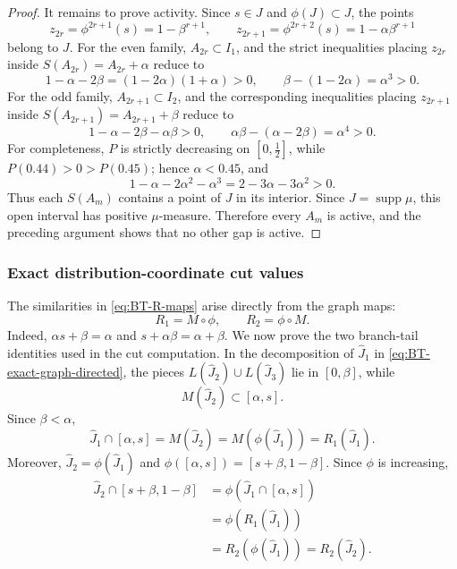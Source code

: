\documentclass[11pt]{amsart}
\theoremstyle{plain}
\theoremstyle{definition}
\theoremstyle{remark}
\DeclareMathOperator{\supp}{supp}
\begin{document}
\begin{proof}
It remains to prove activity. Since \(s\in J\) and \(\phi(J)\subset J\), the points
\[
        z_{2r}=\phi^{2r+1}(s)=1-\beta^{r+1},
        \qquad
        z_{2r+1}=\phi^{2r+2}(s)=1-\alpha\beta^{r+1}
\]
belong to \(J\). For the even family, \(A_{2r}\subset I_1\), and the strict inequalities
placing \(z_{2r}\) inside \(S(A_{2r})=A_{2r}+\alpha\) reduce to
\[
        1-\alpha-2\beta=(1-2\alpha)(1+\alpha)>0,
        \qquad
        \beta-(1-2\alpha)=\alpha^3>0.
\]
For the odd family, \(A_{2r+1}\subset I_2\), and the corresponding inequalities placing
\(z_{2r+1}\) inside \(S(A_{2r+1})=A_{2r+1}+\beta\) reduce to
\[
        1-\alpha-2\beta-\alpha\beta>0,
        \qquad
        \alpha\beta-(\alpha-2\beta)=\alpha^4>0.
\]
For completeness, \(P\) is strictly decreasing on \([0,\frac12]\), while
\(P(0.44)>0>P(0.45)\); hence \(\alpha<0.45\), and
\[
        1-\alpha-2\alpha^2-\alpha^3
        =2-3\alpha-3\alpha^2>0.
\]
Thus each \(S(A_m)\) contains a point of \(J\) in its interior. Since
\(J=\supp\mu\), this open interval has positive \(\mu\)-measure. Therefore every
\(A_m\) is active, and the preceding argument shows that no other gap is active.
\end{proof}

\subsubsection{Exact distribution-coordinate cut values}

The similarities in \eqref{eq:BT-R-maps} arise directly from the graph maps:
\[
        R_1=M\circ\phi,
        \qquad
        R_2=\phi\circ M.
\tag{8.29}
\label{eq:BT-R-compositions}
\]
Indeed, \(\alpha s+\beta=\alpha\) and \(s+\alpha\beta=\alpha+\beta\). We now prove the
two branch-tail identities used in the cut computation. In the decomposition of
\(\widehat J_1\) in \eqref{eq:BT-exact-graph-directed}, the pieces
\(L(\widehat J_2)\cup L(\widehat J_3)\) lie in \([0,\beta]\), while
\[
        M(\widehat J_2)\subset[\alpha,s].
\]
Since \(\beta<\alpha\),
\[
        \widehat J_1\cap[\alpha,s]
        =M(\widehat J_2)
        =M(\phi(\widehat J_1))
        =R_1(\widehat J_1).
\tag{8.30}
\label{eq:BT-right-J1}
\]
Moreover, \(\widehat J_2=\phi(\widehat J_1)\) and
\(\phi([\alpha,s])=[s+\beta,1-\beta]\). Since \(\phi\) is increasing,
\[
\begin{aligned}
\widehat J_2\cap[s+\beta,1-\beta]
&=\phi(\widehat J_1\cap[\alpha,s])\\
&=\phi(R_1(\widehat J_1))\\
&=R_2(\phi(\widehat J_1))
=R_2(\widehat J_2).
\end{aligned}
\tag{8.31}
\label{eq:BT-right-J2}
\]
\end{document}
